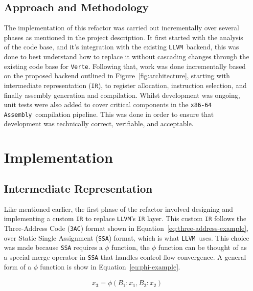 \documentclass[11pt]{article}
\newcommand{\constant}[1]{\texttt{#1}}
\newcommand{\verte}{\texttt{Verte}}
\newcommand{\llvm}{\texttt{LLVM}}
\newcommand{\asm}{\texttt{x86-64 Assembly}}
\newcommand{\figref}[1]{Figure~\ref{#1}}
\newcommand{\eqnref}[1]{Equation~\ref{#1}}
\begin{document}
\subsection{Approach and Methodology}

The implementation of this refactor was carried out incrementally over several phases as mentioned in the project description. It first started with the analysis of the code base, and it's integration with the existing \llvm\ backend, this was done to best understand how to replace it without cascading changes through the existing code base for \verte. Following that, work was done incrementally based on the proposed backend outlined in \figref{fig:architecture}, starting with intermediate representation (\constant{IR}), to register allocation, instruction selection, and finally assembly generation and compilation. Whilst development was ongoing, unit tests were also added to cover critical components in the \asm\ compilation pipeline. This was done in order to ensure that development was technically correct, verifiable, and acceptable.

\section{Implementation}

\subsection{Intermediate Representation}

Like mentioned earlier, the first phase of the refactor involved designing and implementing a custom \constant{IR} to replace \llvm's \constant{IR} layer. This custom \constant{IR} follows the Three-Address Code (\constant{3AC}) format \cite{aho2007compilers} shown in \eqnref{eq:three-address-example}, over Static Single Assignment (\constant{SSA}) format, which is what \llvm\ uses. This choice was made because \constant{SSA} requires a $\phi$ function, the $\phi$ function can be thought of as a special merge operator in \constant{SSA} that handles control flow convergence. A general form of a $\phi$ function is show in \eqnref{eq:phi-example}.

\begin{eq}[!ht]
	\begin{equation}
		\label{eq:phi-example}
		\begin{aligned}
			x_3 = \phi(B_1: x_1, B_2: x_2)
		\end{aligned}
	\end{equation}
	\caption*{Equation 1: Phi-function Example}
\end{eq}
\end{document}
